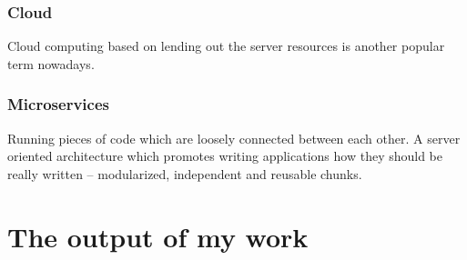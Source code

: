 \documentclass[
  master,
  biblatex,
  glossaries,
  index
]{kidiplom}
\begin{document}
\subsubsection{Cloud}

Cloud computing based on lending out the server resources is another popular term nowadays.

\subsubsection{Microservices}

Running pieces of code which are loosely connected between each other. A server oriented architecture which promotes writing applications how they should be really written -- modularized, independent and reusable chunks. %

\section{The output of my work}


\printbibliography
\end{document}
